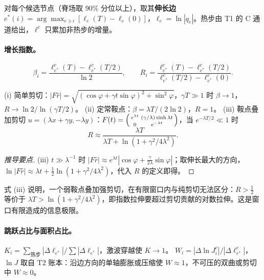 对每个候选节点（脊场取 90\% 分位以上），取其\textbf{伸长边} $e^\ast(i)=\arg\max_{e\ni i}[\ell_e(T)-\ell_e(0)]$，$\ell_e=\ln|q_e|$。热步由 T1 的 C 通道给出，$\ell^c$ 只累加非热步的增量。

\paragraph{增长指数。}
\begin{equation}
\beta_i=\frac{\ell^c_{e^\ast}(T)-\ell^c_{e^\ast}(T/2)}{\ln2},\qquad R_i=\frac{\ell^c_{e^\ast}(T)-\ell^c_{e^\ast}(T/2)}{\ell^c_{e^\ast}(T/2)-\ell^c_{e^\ast}(0)}.
\end{equation}

\begin{proposition}[解析值]
(i) 简单剪切：$|F\hat r|=\sqrt{(\cos\varphi+\gamma t\sin\varphi)^2+\sin^2\varphi}$，$\gamma T\gg1$ 时 $\beta\to1$，$R\to\ln2/\ln(\gamma T/2)$。
(ii) 定常鞍点：$\beta=\lambda T/(2\ln2)$，$R=1$。
(iii) 鞍点叠加剪切 $u=(\lambda x+\gamma y,-\lambda y)$：$F(t)=\begin{psmallmatrix}e^{\lambda t}&(\gamma/\lambda)\sinh\lambda t\\0&e^{-\lambda t}\end{psmallmatrix}$，当 $e^{-\lambda T/2}\ll1$ 时
\begin{equation}
R\approx\frac{\lambda T}{\lambda T+\ln(1+\gamma^2/4\lambda^2)} .
\end{equation}
\end{proposition}
\begin{proof}[推导要点]
(iii) $t\gg\lambda^{-1}$ 时 $|F\hat r|\approx e^{\lambda t}|\cos\varphi+\tfrac{\gamma}{2\lambda}\sin\varphi|$；取伸长最大的方向，$\ln|F\hat r|\approx\lambda t+\tfrac12\ln(1+\gamma^2/4\lambda^2)$，代入 $R$ 的定义即得。
\end{proof}

式 (iii) 说明，一个弱鞍点叠加强剪切，在有限窗口内与纯剪切无法区分：$R>\tfrac12$ 等价于 $\lambda T>\ln(1+\gamma^2/4\lambda^2)$，即指数拉伸要超过剪切贡献的对数拉伸。这是窗口有限造成的信息极限。

\paragraph{跳跃占比与面积占比。}
$K_i=\sum_{\text{热步}}|\Delta\ell_{e^\ast}|/\sum|\Delta\ell_{e^\ast}|$，激波穿越使 $K\to1$。
$W_i=|\Delta\ln J^c_i|/|\Delta\ell^c_{e^\ast}|$，$\ln J$ 取自 T2 账本：沿边方向的单轴膨胀或压缩使 $W\approx1$，不可压的双曲或剪切中 $W\approx0$。

